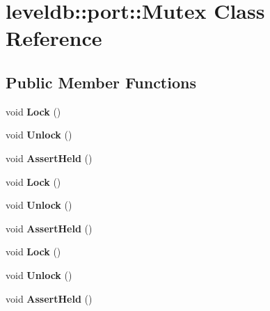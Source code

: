 \hypertarget{classleveldb_1_1port_1_1_mutex}{}\section{leveldb\+:\+:port\+:\+:Mutex Class Reference}
\label{classleveldb_1_1port_1_1_mutex}
\subsection*{Public Member Functions}
\begin{DoxyCompactItemize}
\item 
\mbox{\label{classleveldb_1_1port_1_1_mutex_a9a4da7195ce1802c077bc4d0035d4dd1}} 
void {\bfseries Lock} ()
\item 
\mbox{\label{classleveldb_1_1port_1_1_mutex_a9d69a21c53dad7732b2006acf87f006b}} 
void {\bfseries Unlock} ()
\item 
\mbox{\label{classleveldb_1_1port_1_1_mutex_a9793393529f59bbb4adaf152bbbab42c}} 
void {\bfseries Assert\+Held} ()
\item 
\mbox{\label{classleveldb_1_1port_1_1_mutex_a9a4da7195ce1802c077bc4d0035d4dd1}} 
void {\bfseries Lock} ()
\item 
\mbox{\label{classleveldb_1_1port_1_1_mutex_a9d69a21c53dad7732b2006acf87f006b}} 
void {\bfseries Unlock} ()
\item 
\mbox{\label{classleveldb_1_1port_1_1_mutex_a9793393529f59bbb4adaf152bbbab42c}} 
void {\bfseries Assert\+Held} ()
\item 
\mbox{\label{classleveldb_1_1port_1_1_mutex_a9a4da7195ce1802c077bc4d0035d4dd1}} 
void {\bfseries Lock} ()
\item 
\mbox{\label{classleveldb_1_1port_1_1_mutex_a9d69a21c53dad7732b2006acf87f006b}} 
void {\bfseries Unlock} ()
\item 
\mbox{\label{classleveldb_1_1port_1_1_mutex_a9793393529f59bbb4adaf152bbbab42c}} 
void {\bfseries Assert\+Held} ()
\end{DoxyCompactItemize}
